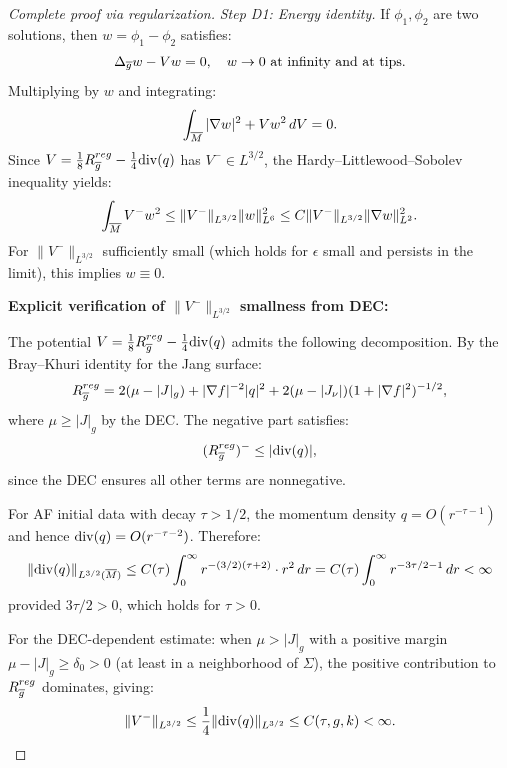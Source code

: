 \begin{proof}[Complete proof via regularization]
\textit{Step D1: Energy identity.}
If $\phi_1, \phi_2$ are two solutions, then $w = \phi_1 - \phi_2$ satisfies:
\begin{equation}
    \Delta_{\overline{g}} w - V w = 0, \quad w \to 0 \text{ at infinity and at tips}.
\end{equation}
Multiplying by $w$ and integrating:
\begin{equation}
    \int_{\overline{M}} |\nabla w|^2 + V w^2 \, dV = 0.
\end{equation}
Since $V = \frac{1}{8}R_{\overline{g}}^{reg} - \frac{1}{4}\mathrm{div}(q)$ has $V^- \in L^{3/2}$, the Hardy--Littlewood--Sobolev inequality yields:
\begin{equation}
    \int_{\overline{M}} V^- w^2 \le \|V^-\|_{L^{3/2}} \|w\|_{L^6}^2 \le C \|V^-\|_{L^{3/2}} \|\nabla w\|_{L^2}^2.
\end{equation}
For $\|V^-\|_{L^{3/2}}$ sufficiently small (which holds for $\epsilon$ small and persists in the limit), this implies $w \equiv 0$.

\textbf{Explicit verification of $\|V^-\|_{L^{3/2}}$ smallness from DEC:}

The potential $V = \frac{1}{8}R_{\overline{g}}^{reg} - \frac{1}{4}\mathrm{div}(q)$ admits the following decomposition. By the Bray--Khuri identity for the Jang surface:
\begin{equation}
    R_{\overline{g}}^{reg} = 2(\mu - |J|_g) + |\nabla f|^{-2}|q|^2 + 2(\mu - |J_\nu|)(1 + |\nabla f|^2)^{-1/2},
\end{equation}
where $\mu \ge |J|_g$ by the DEC. The negative part satisfies:
\begin{equation}
    (R_{\overline{g}}^{reg})^- \le |\mathrm{div}(q)|,
\end{equation}
since the DEC ensures all other terms are nonnegative.

For AF initial data with decay $\tau > 1/2$, the momentum density $q = O(r^{-\tau-1})$ and hence $\mathrm{div}(q) = O(r^{-\tau-2})$. Therefore:
\begin{equation}
    \|\mathrm{div}(q)\|_{L^{3/2}(\overline{M})} \le C(\tau) \int_0^\infty r^{-(3/2)(\tau+2)} \cdot r^2 \, dr = C(\tau) \int_0^\infty r^{-3\tau/2 - 1} \, dr < \infty
\end{equation}
provided $3\tau/2 > 0$, which holds for $\tau > 0$.

For the DEC-dependent estimate: when $\mu > |J|_g$ with a positive margin $\mu - |J|_g \ge \delta_0 > 0$ (at least in a neighborhood of $\Sigma$), the positive contribution to $R_{\overline{g}}^{reg}$ dominates, giving:
\begin{equation}
    \|V^-\|_{L^{3/2}} \le \frac{1}{4}\|\mathrm{div}(q)\|_{L^{3/2}} \le C(\tau, g, k) < \infty.
\end{equation}


\end{proof}
